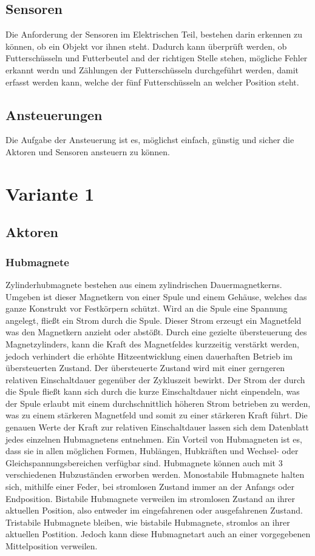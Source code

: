 \subsection{Sensoren}
Die Anforderung der Sensoren im Elektrischen Teil, bestehen darin erkennen zu können, ob ein Objekt vor ihnen steht. Dadurch kann überprüft werden, ob Futterschüsseln und Futterbeutel and der richtigen Stelle stehen, mögliche Fehler erkannt werdn und Zählungen der Futterschüsseln durchgeführt werden, damit erfasst werden kann, welche der fünf Futterschüsseln an welcher Position steht.
\subsection{Ansteuerungen}
Die Aufgabe der Ansteuerung ist es, möglichst einfach, günstig und sicher die Aktoren und Sensoren ansteuern zu können.

\section{Variante 1}
\subsection{Aktoren}
\subsubsection{Hubmagnete}
Zylinderhubmagnete bestehen aus einem zylindrischen Dauermagnetkerns. Umgeben ist dieser Magnetkern von einer Spule und einem Gehäuse, welches das ganze Konstrukt vor Festkörpern schützt. Wird an die Spule eine Spannung angelegt, fließt ein Strom durch die Spule. Dieser Strom erzeugt ein Magnetfeld was den Magnetkern anzieht oder abstößt. Durch eine gezielte übersteuerung des Magnetzylinders, kann die Kraft des Magnetfeldes kurzzeitig verstärkt werden, jedoch verhindert die erhöhte Hitzeentwicklung einen dauerhaften Betrieb im übersteuerten Zustand. Der übersteuerte Zustand wird mit einer gerngeren relativen Einschaltdauer gegenüber der Zykluszeit bewirkt. Der Strom der durch die Spule fließt kann sich durch die kurze Einschaltdauer nicht einpendeln, was der Spule erlaubt mit einem durchschnittlich höheren Strom betrieben zu werden, was zu einem stärkeren Magnetfeld und somit zu einer stärkeren Kraft führt. Die genauen Werte der Kraft zur relativen Einschaltdauer lassen sich dem Datenblatt jedes einzelnen Hubmagnetens entnehmen. Ein Vorteil von Hubmagneten ist es, dass sie in allen möglichen Formen, Hublängen, Hubkräften und Wechsel- oder Gleichspannungsbereichen verfügbar sind. Hubmagnete können auch mit 3 verschiedenen Hubzuständen erworben werden. Monostabile Hubmagnete halten sich, mithilfe einer Feder, bei stromlosen Zustand immer an der Anfangs oder Endposition. Bistabile Hubmagnete verweilen im stromlosen Zustand an ihrer aktuellen Position, also entweder im eingefahrenen oder ausgefahrenen Zustand. Tristabile Hubmagnete bleiben, wie bistabile Hubmagnete, stromlos an ihrer aktuellen Postition. Jedoch kann diese Hubmagnetart auch an einer vorgegebenen Mittelposition verweilen.

